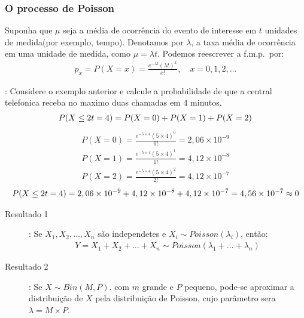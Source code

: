      \subsubsection{O processo de Poisson}
     \begin{description}  
       \item     Suponha que $\mu$ seja a média de ocorrência do evento de interesse
     em $t$ unidades de medida(por exemplo, tempo). Denotamos por $\lambda$,
     a taxa média de ocorrência em uma unidade de medida, como $\mu= \lambda t$.
     Podemos reescrever a f.m.p.\ por:
     \begin{align*}
       p_{x} =P(X=x)= \frac{e^{-\lambda t} \left( \lambda t \right)^{x}}{x!}, \quad x=0,1,2,\ldots
     \end{align*}
       \item[Exemplo]: Considere o exemplo anterior e calcule a probabilidade de que a central 
         telefonica receba no maximo duas chamadas em 4 minutos.
         \begin{align*}
           P(X \leq 2 \/ t=4) = P(X=0)+P(X=1)+P(X=2)
         \end{align*}
     \begin{align*}
       P(X=0) = \frac{e^{-5 \times 4}(5\times 4)^0}{0!}= 2,06 \times 10^{-9}\\
       P(X=1) = \frac{e^{-5 \times 4}(5\times 4)^1}{1!}= 4,12 \times 10^{-8}\\
       P(X=2) = \frac{e^{-5 \times 4}(5\times 4)^2}{2!}= 4,12 \times 10^{-7} 
     \end{align*}
    \begin{align*}
      P(X \leq 2 \/ t=4)= 2,06 \times 10^{-9}+4,12 \times 10^{-8}+4,12 \times 10^{-7} = 4,56 \times 10^{-7} \approx 0
    \end{align*} 
  \item[Resultados Importantes]
    \begin{description}
  \item [Resultado 1]: Se $X_1, X_2,\ldots, X_n$ são independetes e $X_i \mathtt{\sim} Poisson(\lambda_i)$, então:
    \begin{align}
      Y= X_1+X_2+\ldots+X_n \mathtt{\sim} Poisson\left( \lambda_1+\ldots+\lambda_n \right)
    \end{align}
  \item [Resultado 2]: Se $X \mathtt{\sim}Bin(M,P)$. com $m$ grande e $P$ pequeno, pode-se aproximar a distribuição de 
    $X$ pela distribuição de Poisson, cujo parâmetro sera $\lambda = M \times P$.
\end{description}

\end{description}
